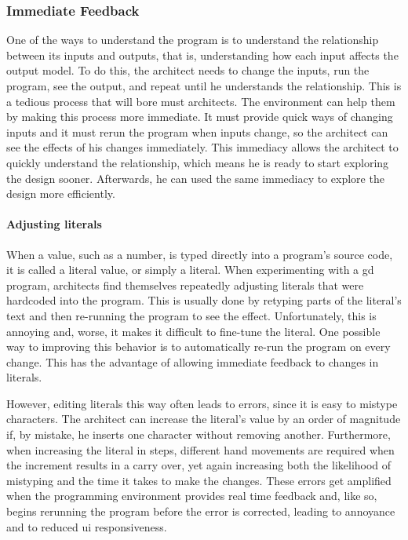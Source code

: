 \subsubsection{Immediate Feedback}
\label{sec:immediate:feedback}
One of the ways to understand the program is to understand the relationship between its inputs and outputs, that is, understanding how each input affects the output model.
To do this, the architect needs to change the inputs, run the program, see the output, and repeat until he understands the relationship.
This is a tedious process that will bore must architects.
The environment can help them by making this process more immediate.
It must provide quick ways of changing inputs and it must rerun the program when inputs change, so the architect can see the effects of his changes immediately.
This immediacy allows the architect to quickly understand the relationship, which means he is ready to start exploring the design sooner.
Afterwards, he can used the same immediacy to explore the design more efficiently.

\paragraph{Adjusting literals}
When a value, such as a number, is typed directly into a program's source code, it is called a literal value, or simply a literal.
When experimenting with a \gls{gd} program, architects find themselves repeatedly adjusting literals that were hardcoded into the program.
This is usually done by retyping parts of the literal's text and then re-running the program to see the effect.
Unfortunately, this is annoying and, worse, it makes it difficult to fine-tune the literal.
One possible way to improving this behavior is to automatically re-run the program on every change.
This has the advantage of allowing immediate feedback to changes in literals.

However, editing literals this way often leads to errors, since it is easy to mistype characters.
The architect can increase the literal's value by an order of magnitude if, by mistake, he inserts one character without removing another.
Furthermore, when increasing the literal in steps, different hand movements are required when the increment results in a carry over, yet again increasing both the likelihood of mistyping and the time it takes to make the changes.
These errors get amplified when the programming environment provides real time feedback and, like so, begins rerunning the program before the error is corrected, leading to annoyance and to reduced \gls{ui} responsiveness.

